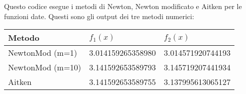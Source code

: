 
Questo codice esegue i metodi di Newton, Newton modificato e Aitken per le funzioni date.
Questi sono gli output dei tre metodi numerici:
\newline
\begin{tabular}{lll}
Metodo & $f_1(x)$ & $f_2(x)$ \\
\hline
NewtonMod (m=1) & 3.014159265358980 & 3.014571920744193\\
NewtonMod (m=10)& 3.141592653589793 & 3.145719207441934\\
Aitken & 3.141592653589755 & 3.137995613065127\\
\end{tabular}
